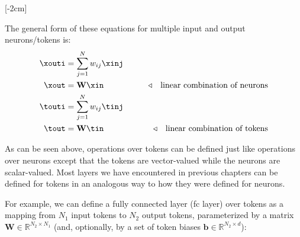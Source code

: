 [-2cm]

The general form of these equations for multiple input and output neurons/tokens is:
\begin{align}
    \xouti & = \sum_{j=1}^N w_{ij}\xinj                                                                                                                \\
    \xout  & = \mathbf{W}\xin            & \quad\quad \triangleleft \quad \text{linear combination of neurons}                                         \\
    \touti & = \sum_{j=1}^N w_{ij} \tinj                                                                                                               \\
    \tout  & = \mathbf{W}\tin            & \quad\quad \triangleleft \quad \text{linear combination of tokens} \label{eqn:transformers:lin_comb_tokens}
\end{align}

As can be seen above, operations over tokens can be defined just like operations over neurons except that the tokens are vector-valued while the neurons are scalar-valued. Most layers we have encountered in previous chapters can be defined for tokens in an analogous way to how they were defined for neurons. %

For example, we can define a fully connected layer (fc layer) over tokens as a mapping from $N_1$ input tokens to $N_2$ output tokens, parameterized by a matrix $\mathbf{W} \in \mathbb{R}^{N_2 \times N_1}$ (and, optionally, by a set of token biases $\mathbf{b} \in \mathbb{R}^{N_2 \times d}$):


